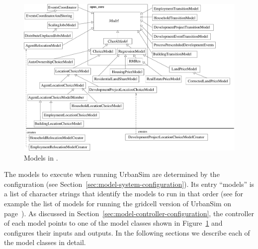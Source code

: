 \begin{figure}[t]
\begin{center}
\includegraphics[scale=0.5]{images/urbansimmodels.pdf}
\caption{\label{fig:urbansim-model}\small Models in .}
\end{center}
\end{figure}

The models to execute when running UrbanSim are determined by the configuration
(see Section~\ref{sec:model-system-configuration}). Its entry ``models''  is a
list of character strings that identify the models to run in that order (see for example 
the list of models for running the gridcell version of UrbanSim on page~\pageref{pg:config-models}).
As discussed in Section~\ref{sec:model-controller-configuration}, 
the controller of each model points to one of the model classes shown in Figure~\ref{fig:urbansim-model}
and configures their inputs and outputs. In the following sections we describe each of the model classes in detail. 


